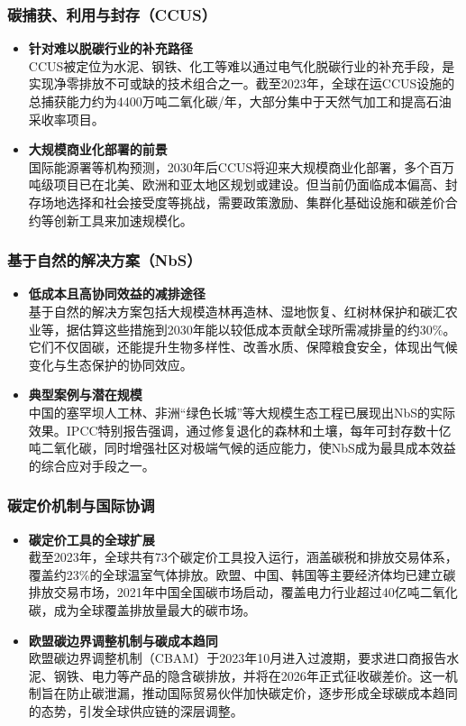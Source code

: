 \documentclass[11pt]{beamer}
\begin{document}
\begin{frame}\frametitle{碳捕获、利用与封存（CCUS）}
\small
\begin{itemize}
    \item \textbf{针对难以脱碳行业的补充路径}\\
    CCUS被定位为水泥、钢铁、化工等难以通过电气化脱碳行业的\alert{补充手段}，是实现净零排放不可或缺的技术组合之一。截至2023年，全球在运CCUS设施的总捕获能力约为\alert{4400万吨二氧化碳/年}，大部分集中于天然气加工和提高石油采收率项目。
    
    \item \textbf{大规模商业化部署的前景}\\
    国际能源署等机构预测，2030年后CCUS将迎来大规模商业化部署，多个百万吨级项目已在北美、欧洲和亚太地区规划或建设。但当前仍面临成本偏高、封存场地选择和社会接受度等挑战，需要政策激励、集群化基础设施和碳差价合约等创新工具来加速规模化。
\end{itemize}
\end{frame}

\begin{frame}\frametitle{基于自然的解决方案（NbS）}
\small
\begin{itemize}
    \item \textbf{低成本且高协同效益的减排途径}\\
    基于自然的解决方案包括大规模造林再造林、湿地恢复、红树林保护和碳汇农业等，据估算这些措施到2030年能以\alert{较低成本}贡献全球所需减排量的约\alert{30\%}。它们不仅固碳，还能提升生物多样性、改善水质、保障粮食安全，体现出气候变化与生态保护的协同效应。
    
    \item \textbf{典型案例与潜在规模}\\
    中国的塞罕坝人工林、非洲“绿色长城”等大规模生态工程已展现出NbS的实际效果。IPCC特别报告强调，通过修复退化的森林和土壤，每年可封存数十亿吨二氧化碳，同时增强社区对极端气候的适应能力，使NbS成为最具成本效益的综合应对手段之一。
\end{itemize}
\end{frame}

\begin{frame}\frametitle{碳定价机制与国际协调}
\small
\begin{itemize}
    \item \textbf{碳定价工具的全球扩展}\\
    截至2023年，全球共有\alert{73个}碳定价工具投入运行，涵盖碳税和排放交易体系，覆盖约\alert{23\%}的全球温室气体排放。欧盟、中国、韩国等主要经济体均已建立碳排放交易市场，2021年中国全国碳市场启动，覆盖电力行业超过40亿吨二氧化碳，成为全球覆盖排放量最大的碳市场。
    
    \item \textbf{欧盟碳边界调整机制与碳成本趋同}\\
    欧盟碳边界调整机制（CBAM）于\alert{2023年10月}进入过渡期，要求进口商报告水泥、钢铁、电力等产品的隐含碳排放，并将在2026年正式征收碳差价。这一机制旨在防止碳泄漏，推动国际贸易伙伴加快碳定价，逐步形成全球碳成本趋同的态势，引发全球供应链的深层调整。
\end{itemize}
\end{frame}
\end{document}
